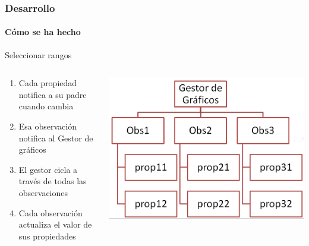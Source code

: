 \begin{frame}
    \frametitle{Desarrollo}
    \framesubtitle{C\'omo se ha hecho}
    
    \begin{block}{Seleccionar rangos}
        
        \begin{columns}[T]
            \begin{column}[T]{0.5\linewidth}
                \begin{enumerate}
                    \item Cada propiedad notifica a su padre cuando cambia
                    \item Esa observaci\'on notifica al Gestor de gr\'aficos 
                    \item El gestor cicla a trav\'es de todas las observaciones
                    \item Cada observaci\'on actualiza el valor de sus 
                    propiedades
                \end{enumerate}
            \end{column}
            
            \begin{column}[T]{0.5\linewidth}
                    
                \includegraphics[width=1.0\linewidth]{Figures/EstructuraDatos.PNG}
               
            \end{column}
        \end{columns}
       
    \end{block}
\end{frame}

